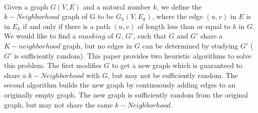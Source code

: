 
\\
\indent Given a graph $G(V,E)$ and a natural number $k$, we define the $k-Neighborhood$  graph of G to be $G_k(V, E_k)$, where the edge $(u,v)$ in $E$ is in $E_k$ if and only if there is a path $(u,v)$ of length less than or equal to $k$ in $G$. We would like to find a $masking$ of $G$, $G'$, such that $G$ and $G'$ share a $K-neighborhood$ graph, but no edges in $G$ can be determined by studying $G'$ ($G'$ is sufficiently random). This paper provides two heuristic algorithms to solve this problem. The first modifies $G$ to get a new graph which is guaranteed to share a $k-Neighborhood$ with $G$, but may not be sufficiently random. The second algorithm builds the new graph by continuously adding edges to an originally empty graph. The new graph is sufficiently random from the original graph, but may not share the same $k-Neighborhood$.
\\\\
